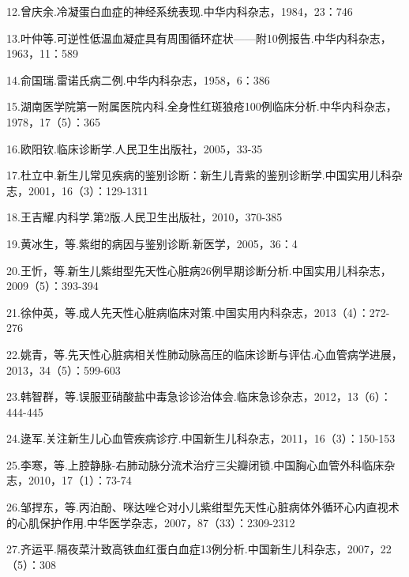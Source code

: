 12.曾庆余.冷凝蛋白血症的神经系统表现.中华内科杂志，1984，23：746

13.叶仲等.可逆性低温血凝症具有周围循环症状------附10例报告.中华内科杂志，1963，11：589

14.俞国瑞.雷诺氏病二例.中华内科杂志，1958，6：386

15.湖南医学院第一附属医院内科.全身性红斑狼疮100例临床分析.中华内科杂志，1978，17（5）：365

16.欧阳钦.临床诊断学.人民卫生出版社，2005，33-35

17.杜立中.新生儿常见疾病的鉴别诊断：新生儿青紫的鉴别诊断学.中国实用儿科杂志，2001，16（3）：129-1311

18.王吉耀.内科学.第2版.人民卫生出版社，2010，370-385

19.黄冰生，等.紫绀的病因与鉴别诊断.新医学，2005，36：4

20.王忻，等.新生儿紫绀型先天性心脏病26例早期诊断分析.中国实用儿科杂志，2009（5）：393-394

21.徐仲英，等.成人先天性心脏病临床对策.中国实用内科杂志，2013（4）：272-276

22.姚青，等.先天性心脏病相关性肺动脉高压的临床诊断与评估.心血管病学进展，2013，34（5）：599-603

23.韩智群，等.误服亚硝酸盐中毒急诊诊治体会.临床急诊杂志，2012，13（6）：444-445

24.逯军.关注新生儿心血管疾病诊疗.中国新生儿科杂志，2011，16（3）：150-153

25.李寒，等.上腔静脉-右肺动脉分流术治疗三尖瓣闭锁.中国胸心血管外科临床杂志，2010，17（1）：73-74

26.邹捍东，等.丙泊酚、咪达唑仑对小儿紫绀型先天性心脏病体外循环心内直视术的心肌保护作用.中华医学杂志，2007，87（33）：2309-2312

27.齐运平.隔夜菜汁致高铁血红蛋白血症13例分析.中国新生儿科杂志，2007，22（5）：308

\protect\hypertarget{text00123.html}{}{}

